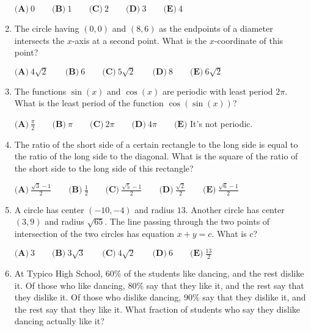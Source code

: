 \documentclass{article}
\begin{document}
\begin{enumerate}[label=\arabic*., itemsep=0.5em]
\(\textbf{(A)}\ 0\qquad\textbf{(B)}\ 1\qquad\textbf{(C)}\ 2\qquad\textbf{(D)}\ 3\qquad\textbf{(E)}\ 4\)\par \vspace{0.5em}\item The circle having \((0,0)\) and \((8,6)\) as the endpoints of a diameter intersects the \(x\)-axis at a second point. What is the \(x\)-coordinate of this point? 

\(\textbf{(A)}\ 4\sqrt{2} \qquad \textbf{(B)}\ 6\qquad \textbf{(C)}\ 5\sqrt{2}\qquad \textbf{(D)}\ 8\qquad \textbf{(E)}\ 6\sqrt{2}\)\par \vspace{0.5em}\item The functions \(\sin(x)\) and \(\cos(x)\) are periodic with least period \(2\pi\). What is the least period of the function \(\cos(\sin(x))\)?

\(\textbf{(A)}\ \frac{\pi}{2}\qquad\textbf{(B)}\ \pi\qquad\textbf{(C)}\ 2\pi \qquad\textbf{(D)}\ 4\pi \qquad\textbf{(E)}\) It's not periodic.\par \vspace{0.5em}\item The ratio of the short side of a certain rectangle to the long side is equal to the ratio of the long side to the diagonal. What is the square of the ratio of the short side to the long side of this rectangle?

\(\textbf{(A)}\ \frac{\sqrt{3}-1}{2}\qquad\textbf{(B)}\ \frac{1}{2}\qquad\textbf{(C)}\ \frac{\sqrt{5}-1}{2} \qquad\textbf{(D)}\ \frac{\sqrt{2}}{2} \qquad\textbf{(E)}\ \frac{\sqrt{6}-1}{2}\)\par \vspace{0.5em}\item A circle has center \((-10,-4)\) and radius \(13\). Another circle has center \((3,9)\) and radius \(\sqrt{65}\). The line passing through the two points of intersection of the two circles has equation \(x + y = c\). What is \(c\)?

\(\textbf{(A)}\ 3\qquad\textbf{(B)}\ 3\sqrt{3}\qquad\textbf{(C)}\ 4\sqrt{2}\qquad\textbf{(D)}\ 6\qquad\textbf{(E)}\ \frac{13}{2}\)\par \vspace{0.5em}\item At Typico High School, \(60\%\) of the students like dancing, and the rest dislike it. Of those who like dancing, \(80\%\) say that they like it, and the rest say that they dislike it. Of those who dislike dancing, \(90\%\) say that they dislike it, and the rest say that they like it. What fraction of students who say they dislike dancing actually like it?


\end{enumerate}
\end{document}
